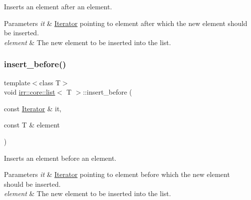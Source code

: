 Inserts an element after an element. 


\begin{DoxyParams}{Parameters}
{\em it} & \hyperlink{classirr_1_1core_1_1list_1_1Iterator}{Iterator} pointing to element after which the new element should be inserted. \\
\hline
{\em element} & The new element to be inserted into the list. \\
\hline
\end{DoxyParams}
\mbox{\label{classirr_1_1core_1_1list_a366070e0356029f0b355f5dd81710b29}} 
\subsubsection{\texorpdfstring{insert\+\_\+before()}{insert\_before()}\hspace{0.1cm}{\footnotesize\ttfamily [1/2]}}
{\footnotesize\ttfamily template$<$class T$>$ \\
void \hyperlink{classirr_1_1core_1_1list}{irr\+::core\+::list}$<$ T $>$\+::insert\+\_\+before (\begin{DoxyParamCaption}\item[{const \hyperlink{classirr_1_1core_1_1list_1_1Iterator}{Iterator} \&}]{it,  }\item[{const T \&}]{element }\end{DoxyParamCaption})\hspace{0.3cm}{\ttfamily [inline]}}



Inserts an element before an element. 


\begin{DoxyParams}{Parameters}
{\em it} & \hyperlink{classirr_1_1core_1_1list_1_1Iterator}{Iterator} pointing to element before which the new element should be inserted. \\
\hline
{\em element} & The new element to be inserted into the list. \\
\hline
\end{DoxyParams}
\mbox{\label{classirr_1_1core_1_1list_a366070e0356029f0b355f5dd81710b29}} 
